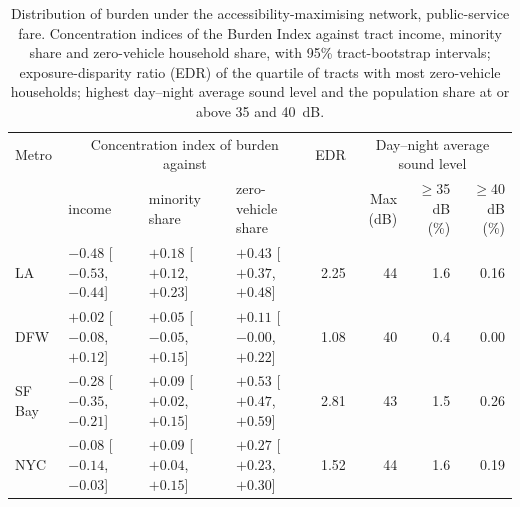 \begin{table}[!htbp]
\centering
\caption{Distribution of burden under the accessibility-maximising network, public-service fare. Concentration indices of the Burden Index against tract income, minority share and zero-vehicle household share, with 95\% tract-bootstrap intervals; exposure-disparity ratio (EDR) of the quartile of tracts with most zero-vehicle households; highest day--night average sound level and the population share at or above 35 and 40~dB.}
\label{tab:burden}
\footnotesize\setlength{\tabcolsep}{4pt}
\begin{tabular}{llllrrrr}
\toprule
Metro & \multicolumn{3}{c}{Concentration index of burden against} & EDR & \multicolumn{3}{c}{Day--night average sound level} \\
 & income & minority share & zero-vehicle share & & Max (dB) & $\geq$35 dB (\%) & $\geq$40 dB (\%) \\
\midrule
LA & $-0.48$ [$-0.53$, $-0.44$] & $+0.18$ [$+0.12$, $+0.23$] & $+0.43$ [$+0.37$, $+0.48$] & 2.25 & 44 & 1.6 & 0.16 \\
DFW & $+0.02$ [$-0.08$, $+0.12$] & $+0.05$ [$-0.05$, $+0.15$] & $+0.11$ [$-0.00$, $+0.22$] & 1.08 & 40 & 0.4 & 0.00 \\
SF Bay & $-0.28$ [$-0.35$, $-0.21$] & $+0.09$ [$+0.02$, $+0.15$] & $+0.53$ [$+0.47$, $+0.59$] & 2.81 & 43 & 1.5 & 0.26 \\
NYC & $-0.08$ [$-0.14$, $-0.03$] & $+0.09$ [$+0.04$, $+0.15$] & $+0.27$ [$+0.23$, $+0.30$] & 1.52 & 44 & 1.6 & 0.19 \\
\bottomrule
\end{tabular}
\end{table}

